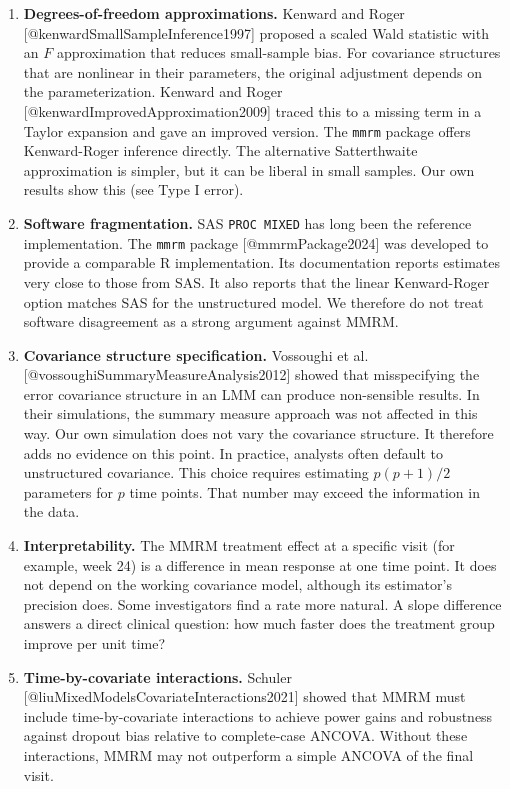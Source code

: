 \documentclass[
  11pt,
]{article}
\begin{document}
\begin{enumerate}
\item \textbf{Degrees-of-freedom approximations.}
  Kenward and Roger [@kenwardSmallSampleInference1997] proposed a scaled Wald
  statistic with an $F$ approximation that reduces
  small-sample bias. For covariance structures that are
  nonlinear in their parameters, the original adjustment
  depends on the parameterization.
  Kenward and Roger [@kenwardImprovedApproximation2009] traced this to a
  missing term in a Taylor expansion and gave an improved version. The
  \texttt{mmrm} package offers Kenward-Roger inference directly. The
  alternative Satterthwaite approximation is simpler, but it can be
  liberal in small samples. Our own results show this (see Type I
  error).

\item \textbf{Software fragmentation.} SAS \texttt{PROC MIXED}
  has long been the reference implementation. The
  \texttt{mmrm} package [@mmrmPackage2024] was developed to
  provide a comparable R implementation. Its documentation
  reports estimates very close to those from SAS. It also
  reports that the linear Kenward-Roger option matches SAS for
  the unstructured model. We therefore do not treat software
  disagreement as a strong argument against MMRM.

\item \textbf{Covariance structure specification.}
  Vossoughi et al. [@vossoughiSummaryMeasureAnalysis2012] showed that
  misspecifying the error covariance structure in an LMM can
  produce non-sensible results. In their simulations, the
  summary measure approach was not affected in this way. Our
  own simulation does not vary the covariance structure. It
  therefore adds no evidence on this point. In practice,
  analysts often default to unstructured covariance.
  This choice requires estimating $p(p+1)/2$ parameters for
  $p$ time points. That number may exceed the information in
  the data.

\item \textbf{Interpretability.} The MMRM treatment effect at
  a specific visit (for example, week 24) is a difference in
  mean response at one time point. It does not depend on the
  working covariance model, although its estimator's precision
  does. Some investigators find a rate more natural. A slope
  difference answers a direct clinical question: how much
  faster does the treatment group improve per unit time?

\item \textbf{Time-by-covariate interactions.}
  Schuler [@liuMixedModelsCovariateInteractions2021] showed that
  MMRM must include time-by-covariate interactions to achieve
  power gains and robustness against dropout bias relative to
  complete-case ANCOVA. Without these interactions, MMRM may
  not outperform a simple ANCOVA of the final visit.
\end{enumerate}
\end{document}
